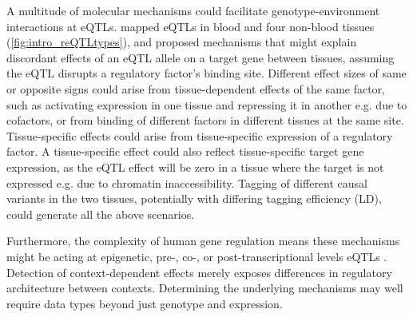 \begin{outline}
A multitude of molecular mechanisms could facilitate genotype-environment interactions at \glspl{eQTL}.
\textcite{fu2012UnravelingRegulatoryMechanisms} mapped \glspl{eQTL} in blood and four non-blood tissues (\cref{fig:intro_reQTLtypes}), 
and proposed mechanisms that might explain discordant effects of an \gls{eQTL} allele on a target gene between tissues,
assuming the \gls{eQTL} disrupts a regulatory factor's binding site.
Different effect sizes of same or opposite signs could arise 
from tissue-dependent effects of the same factor, such as activating expression in one tissue and repressing it in another e.g. due to cofactors,
or from binding of different factors in different tissues at the same site.
Tissue-specific effects could arise from tissue-specific expression of a regulatory factor.
A tissue-specific effect could also reflect tissue-specific target gene expression,
as the \gls{eQTL} effect will be zero in a tissue where the target is not expressed e.g. due to chromatin inaccessibility.
Tagging of different causal variants in the two tissues, potentially with differing tagging efficiency (\gls{LD}), could generate all the above scenarios.

Furthermore, the complexity of human gene regulation means these mechanisms might be acting at epigenetic, pre-, co-, or post-transcriptional levels \glspl{eQTL} \autocite{gaffney2013GlobalPropertiesFunctional}.
Detection of context-dependent effects merely exposes differences in regulatory architecture between contexts.
Determining the underlying mechanisms may well require data types beyond just genotype and expression.


\end{outline}
